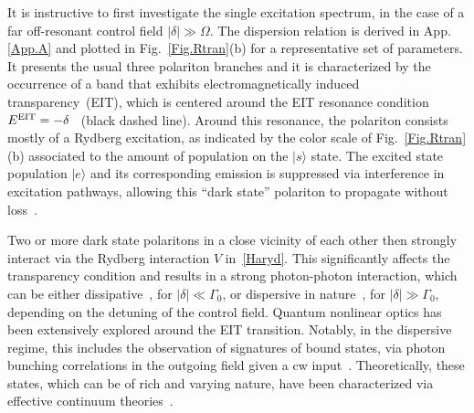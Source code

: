 \documentclass[pra,twocolumn,showpacs,preprintnumbers,amsmath,amssymb]{revtex4-1}
\begin{document}
It is instructive to first investigate the single excitation spectrum, in the case of a far off-resonant control field $|\delta|\gg \Omega$. The dispersion relation is derived in App.\ref{App.A} and plotted in Fig.~\ref{Fig.Rtran}(b) for a representative set of parameters.  It presents the usual three polariton branches \cite{lukinEIT,bienas}  and it  is characterized by the occurrence of a band that exhibits electromagnetically induced transparency~(EIT), which is centered around the EIT resonance condition $E^{\rm EIT}=-\delta$~\cite{lukinEIT} (black dashed line). 
Around this resonance, the polariton consists mostly of a Rydberg excitation, as indicated by the color scale of Fig.~\ref{Fig.Rtran}(b) associated to the amount of population on the $|s\rangle$ state. The excited state population $|e\rangle$ and its corresponding emission is suppressed via interference in excitation pathways, allowing this ``dark state'' polariton to propagate without loss~\cite{lukinEIT}.

Two or more dark state polaritons in a close vicinity of each other then strongly interact via the Rydberg interaction $V$ in~\eqref{Haryd}. This significantly affects the transparency condition and results in a strong photon-photon interaction, which can be either dissipative~\cite{Peyr}, for $|\delta |\ll\Gamma_0$, or dispersive in nature~\cite{first}, for $|\delta |\gg\Gamma_0$, depending on the detuning of the control field.
Quantum nonlinear optics has been extensively explored around the EIT transition. Notably, in the dispersive regime, this includes the observation of signatures of bound states, via photon bunching correlations in the outgoing field given a cw input~\cite{first,LiangBS}. Theoretically, these states, which can be of rich and varying nature, have been characterized via effective continuum theories~\cite{bienas,Efimov,magrebi}.\\
 
\end{document}
